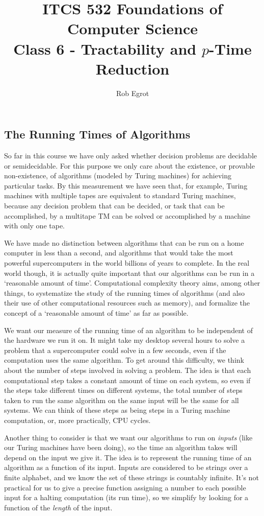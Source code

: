 \documentclass{article}
\title{ITCS 532 Foundations of Computer Science\\
Class 6 - Tractability and $p$-Time Reduction}
\author{Rob Egrot}
\date{}
\theoremstyle{plain}
\theoremstyle{definition}
\begin{document}
\maketitle
\subsection{The Running Times of Algorithms}
So far in this course we have only asked whether decision problems are decidable or semidecidable. For this purpose we only care about the existence, or provable non-existence, of algorithms (modeled by Turing machines) for achieving particular tasks. By this measurement we have seen that, for example, Turing machines with multiple tapes are equivalent to standard Turing machines, because any decision problem that can be decided, or task that can be accomplished, by a multitape TM can be solved or accomplished by a machine with only one tape. 

We have made no distinction between algorithms that can be run on a home computer in less than a second, and algorithms that would take the most powerful supercomputers in the world billions of years to complete. In the real world though, it is actually quite important that our algorithms can be run in a `reasonable amount of time'. Computational complexity theory aims, among other things, to systematize the study of the running times of algorithms (and also their use of other computational resources such as memory), and formalize the concept of a `reasonable amount of time' as far as possible.

We want our measure of the running time of an algorithm to be independent of the hardware we run it on. It might take my desktop several hours to solve a problem that a supercomputer could solve in a few seconds, even if the computation uses the same algorithm. To get around this difficulty, we think about the number of steps involved in solving a problem. The idea is that each computational step takes a constant amount of time on each system, so even if the steps take different times on different systems, the total number of steps taken to run the same algorithm on the same input will be the same for all systems. We can think of these steps as being steps in a Turing machine computation, or, more practically, CPU cycles.

Another thing to consider is that we want our algorithms to run on \emph{inputs} (like our Turing machines have been doing), so the time an algorithm takes will depend on the input we give it. The idea is to represent the running time of an algorithm as a function of its input. Inputs are considered to be strings over a finite alphabet, and we know the set of these strings is countably infinite. It's not practical for us to give a precise function assigning a number to each possible input for a halting computation (its run time), so we simplify by looking for a function of the \emph{length} of the input. 
\end{document}
